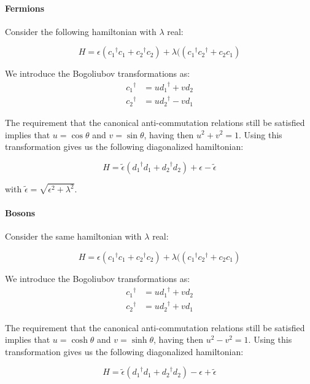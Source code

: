 \documentclass[11pt]{article} %
\newcommand{\1}{{\rm 1\hspace*{-0.38ex}%
\rule{0.1ex}{1.52ex}\hspace*{0.2ex}}}
\newcommand{\h}[1]{{#1}^{\dagger}}
\begin{document}
\paragraph{Fermions}

Consider the following hamiltonian with $\lambda$ real:

\begin{equation}
H= \epsilon (\h{c_1}c_1 + \h{c_2} c_2) + \lambda ((\h{c_1}\h{c_2 }+ c_2 c_1)
\end{equation}

We introduce the Bogoliubov transformations as:
\begin{align}
\h{c_1}&= u \h{d_1} +v d_2 \\
\h{c_2}&= u \h{d_2} -v d_1 
\end{align}

The requirement that the canonical anti-commutation relations still be satisfied implies that $u= \cos{\theta}$ and $v=\sin{\theta}$, having then $u^2+v^2 =1$. Using this transformation gives us the following diagonalized hamiltonian:

\begin{equation}
H= \tilde{\epsilon} (\h{d_1}d_1 + \h{d_2} d_2) + \epsilon - \tilde{\epsilon}
\end{equation}

with $\tilde{\epsilon} = \sqrt{\epsilon^2 + \lambda^2}$. 

\paragraph{Bosons}

Consider the same hamiltonian with $\lambda$ real:

\begin{equation}
H= \epsilon (\h{c_1}c_1 + \h{c_2} c_2) + \lambda ((\h{c_1}\h{c_2 }+ c_2 c_1)
\end{equation}

We introduce the Bogoliubov transformations as:
\begin{align}
\h{c_1}&= u \h{d_1} +v d_2 \\
\h{c_2}&= u \h{d_2} +v d_1 
\end{align}

The requirement that the canonical anti-commutation relations still be satisfied implies that $u= \cosh{\theta}$ and $v=\sinh{\theta}$, having then $u^2-v^2 =1$. Using this transformation gives us the following diagonalized hamiltonian:

\begin{equation}
H= \tilde{\epsilon} (\h{d_1}d_1 + \h{d_2} d_2) - \epsilon + \tilde{\epsilon}
\end{equation}
\end{document}

